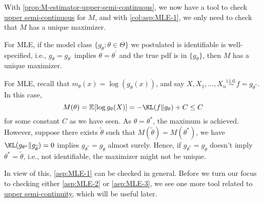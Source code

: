 With \autoref{prop:M-estimator-upper-semi-continuous}, we now have a tool to check \hyperref[def:upper-semi-continuous]{upper semi-continuous} for \(M\), and with \autoref{col:asp:MLE-1}, we only need to check that \(M\) has a unique maximizer.

\begin{eg}[MLE]
	For MLE, if the model class \(\{ g_\theta \colon \theta \in \Theta \} \) we postulated is identifiable is well-specified, i.e., \(g_{\theta } = g_{\theta ^{\prime} }\) implies \(\theta = \theta ^{\prime} \) and the true pdf is in \(\{ g_\theta  \} \), then \(M\) has a unique maximizer.
\end{eg}
\begin{explanation}
	For MLE, recall that \(m_\theta (x) = \log (g_\theta (x))\), and say \(X, X_1, \dots , X_n \overset{\text{i.i.d.} }{\sim } f = g_{\theta ^{\ast} }\). In this case,
	\[
		M(\theta )
		= \mathbb{E}_{}[\log g_\theta (X)]
		= - \KL(f \Vert g_\theta ) + C
		\leq C
	\]
	for some constant \(C\) as we have seen. As \(\theta = \theta ^{\ast} \), the maximum is achieved. However, suppose there exists \(\widetilde{\theta} \) such that \(M(\widetilde{\theta} ) = M(\theta ^{\ast} )\), we have \(\KL(g_{\theta ^{\ast} } \Vert g_{\widetilde{\theta} }) = 0\) implies \(g_{\theta ^{\ast} } = g_{\widetilde{\theta} }\) almost surely. Hence, if \(g_{\theta ^{\ast} } = g_{\widetilde{\theta} }\) doesn't imply \(\theta ^{\ast} = \widetilde{\theta} \), i.e., not identifiable, the maximizer might not be unique.
\end{explanation}

In view of this, \autoref{asp:MLE-1} can be checked in general. Before we turn our focus to checking either \autoref{asp:MLE-2} or \autoref{asp:MLE-3}, we see one more tool related to \hyperref[def:upper-semi-continuous]{upper semi-continuity}, which will be useful later.

